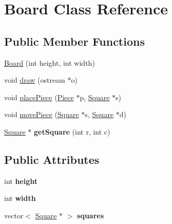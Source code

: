 \hypertarget{classBoard}{}\section{Board Class Reference}
\label{classBoard}
\subsection*{Public Member Functions}
\begin{DoxyCompactItemize}
\item 
\hyperlink{classBoard_a1291ca893864123e2a144ce5e4d8beb3}{Board} (int height, int width)
\item 
void \hyperlink{classBoard_a07010bc149d198961c4669cec2ca4905}{draw} (ostream $\ast$o)
\item 
void \hyperlink{classBoard_ab96f988bdac00e84aa3ae9995e16921c}{place\+Piece} (\hyperlink{classPiece}{Piece} $\ast$p, \hyperlink{classSquare}{Square} $\ast$s)
\item 
void \hyperlink{classBoard_a71bbcd990439137e81b14ab229787daa}{move\+Piece} (\hyperlink{classSquare}{Square} $\ast$s, \hyperlink{classSquare}{Square} $\ast$d)
\item 
\hypertarget{classBoard_afa30630891e15327329bd1fb62de3484}{}\hyperlink{classSquare}{Square} $\ast$ {\bfseries get\+Square} (int r, int c)\label{classBoard_afa30630891e15327329bd1fb62de3484}

\end{DoxyCompactItemize}
\subsection*{Public Attributes}
\begin{DoxyCompactItemize}
\item 
\hypertarget{classBoard_aa0cb8de0254520dc08dab5796643c8e5}{}int {\bfseries height}\label{classBoard_aa0cb8de0254520dc08dab5796643c8e5}

\item 
\hypertarget{classBoard_a90a8efaa4736af25511ac948bdd27d6c}{}int {\bfseries width}\label{classBoard_a90a8efaa4736af25511ac948bdd27d6c}

\item 
\hypertarget{classBoard_a7a0a34a623e8fd5e350fdb31bd10f182}{}vector$<$ \hyperlink{classSquare}{Square} $\ast$ $>$ {\bfseries squares}\label{classBoard_a7a0a34a623e8fd5e350fdb31bd10f182}

\end{DoxyCompactItemize}



